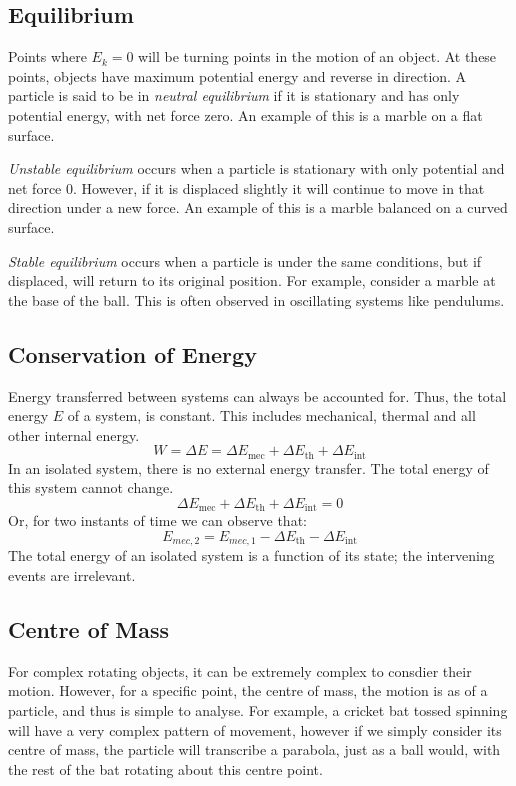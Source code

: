 \documentclass[12pt]{report}
\begin{document}
\begin{flushleft}
\subsection*{Equilibrium}
Points where \(E_k = 0\) will be turning points in the motion of an object. 
At these points, objects have maximum potential energy and reverse in 
direction. A particle is said to be in \textit{neutral equilibrium} if it is 
stationary and has only potential energy, with net force zero. An example of 
this is a marble on a flat surface.

\bigskip
\textit{Unstable equilibrium} occurs when a particle is stationary with only 
potential and net force \(0\). However, if it is displaced slightly it will 
continue to move in that direction under a new force. An example of this is a 
marble balanced on a curved surface.

\bigskip
\textit{Stable equilibrium} occurs when a particle is under the same 
conditions, but if displaced, will return to its original position. For 
example, consider a marble at the base of the ball. This is often observed in
oscillating systems like pendulums.

\subsection*{Conservation of Energy}
Energy transferred between systems can always be accounted for. Thus, the total
energy \(E\) of a system, is constant. This includes mechanical, thermal and 
all other internal energy.
\[W = \Delta E = \Delta E_\mathrm{mec} + 
\Delta E_\mathrm{th} + \Delta E_\mathrm{int}\]
In an isolated system, there is no external energy transfer. The total energy
of this system cannot change.
\[\Delta E_\mathrm{mec} + \Delta E_\mathrm{th} + \Delta E_\mathrm{int} = 0\]
Or, for two instants of time we can observe that:
\[E_{mec,2} = E_{mec,1} - \Delta E_\mathrm{th} - \Delta E_\mathrm{int}\]
The total energy of an isolated system is a function of its state; the
intervening events are irrelevant.

\subsection*{Centre of Mass}
For complex rotating objects, it can be extremely complex to consdier their 
motion. However, for a specific point, the centre of mass, the motion is as of
a particle, and thus is simple to analyse. For example, a cricket bat tossed 
spinning will have a very complex pattern of movement, however if we simply 
consider its centre of mass, the particle will transcribe a parabola, just as a
ball would, with the rest of the bat rotating about this centre point.


\end{flushleft}
\end{document}
